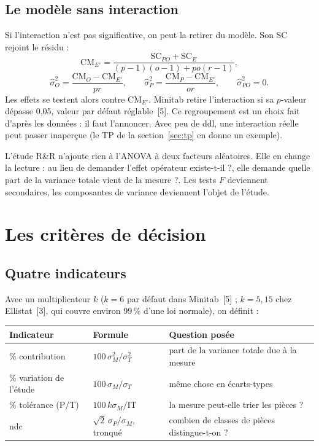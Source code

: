 \documentclass[11pt,a4paper]{article}
\theoremstyle{sj}
\theoremstyle{definition}
\theoremstyle{remark}
\newcommand{\SC}{\mathrm{SC}}
\newcommand{\CM}{\mathrm{CM}}
\providecommand{\og}{\guillemotleft\nobreakspace}
\providecommand{\fg}{\nobreakspace\guillemotright}
\begin{document}
\subsection{Le modèle sans interaction}

Si l'interaction n'est pas significative, on peut la retirer du modèle. Son SC rejoint le résidu :
\[
\CM_{E'}=\frac{\SC_{PO}+\SC_E}{(p-1)(o-1)+po(r-1)},
\]
\[
\hat\sigma_O^2=\frac{\CM_O-\CM_{E'}}{pr},\qquad
\hat\sigma_P^2=\frac{\CM_P-\CM_{E'}}{or},\qquad \hat\sigma_{PO}^2=0.
\]
Les effets se testent alors contre $\CM_{E'}$. Minitab retire l'interaction si sa $p$-valeur dépasse 0,05, valeur par défaut réglable~[5]. Ce regroupement est un choix fait d'après les données : il faut l'annoncer. Avec peu de ddl, une interaction réelle peut passer inaperçue (le TP de la section~\ref{sec:tp} en donne un exemple).

\begin{essentiel}
L'étude R\&R n'ajoute rien à l'ANOVA à deux facteurs aléatoires. Elle en change la lecture : au lieu de demander \og l'effet opérateur existe-t-il ?\fg{}, elle demande \og quelle part de la variance totale vient de la mesure ?\fg{}. Les tests $F$ deviennent secondaires, les composantes de variance deviennent l'objet de l'étude.
\end{essentiel}

\section{Les critères de décision}\label{sec:criteres}

\subsection{Quatre indicateurs}

Avec un multiplicateur $k$ ($k=6$ par défaut dans Minitab~[5] ; $k=5{,}15$ chez Ellistat~[3], qui couvre environ 99\,\% d'une loi normale), on définit :
\begin{center}
\small
\begin{tabular}{l l p{5.6cm}}
\toprule
Indicateur & Formule & Question posée\\
\midrule
\% contribution & $100\,\sigma_M^2/\sigma_T^2$ & part de la variance totale due à la mesure\\
\% variation de l'étude & $100\,\sigma_M/\sigma_T$ & même chose en écarts-types\\
\% tolérance (P/T) & $100\,k\sigma_M/\mathrm{IT}$ & la mesure peut-elle trier les pièces ?\\
ndc & $\sqrt2\,\sigma_P/\sigma_M$, tronqué & combien de classes de pièces distingue-t-on ?\\
\bottomrule
\end{tabular}
\end{center}
\end{document}
